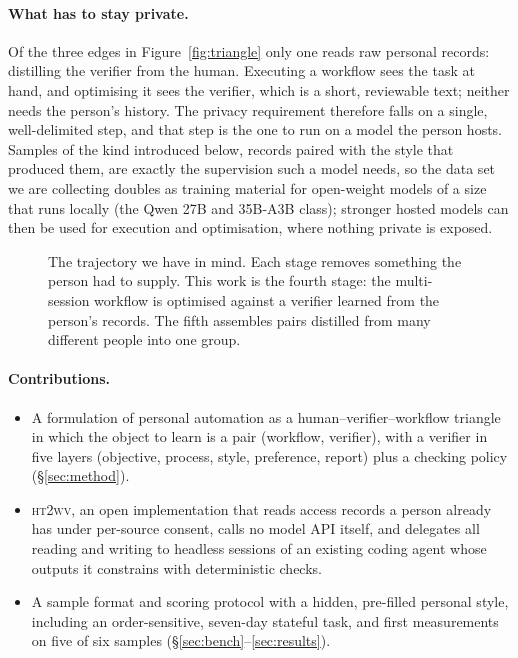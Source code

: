 \documentclass[10pt]{article}
\newcommand{\sys}{\textsc{ht2wv}}
\begin{document}
\paragraph{What has to stay private.} Of the three edges in Figure~\ref{fig:triangle} only one reads raw personal
records: distilling the verifier from the human. Executing a workflow sees the task at hand, and optimising it
sees the verifier, which is a short, reviewable text; neither needs the person's history. The privacy requirement
therefore falls on a single, well-delimited step, and that step is the one to run on a model the person hosts.
Samples of the kind introduced below, records paired with the style that produced them, are exactly the
supervision such a model needs, so the data set we are collecting doubles as training material for open-weight
models of a size that runs locally (the Qwen 27B and 35B-A3B class); stronger hosted models can then be used for
execution and optimisation, where nothing private is exposed.

\begin{figure}[t]
\centering

\caption{The trajectory we have in mind. Each stage removes something the person had to supply. This work is the
fourth stage: the multi-session workflow is optimised against a verifier learned from the person's records. The
fifth assembles pairs distilled from many different people into one group.}
\label{fig:ladder}
\end{figure}

\paragraph{Contributions.}
\begin{itemize}
\item A formulation of personal automation as a human--verifier--workflow triangle in which the object to learn is
      a pair (workflow, verifier), with a verifier in five layers
      (objective, process, style, preference, report) plus a checking policy (\S\ref{sec:method}).
\item \sys{}, an open implementation that reads access records a person already has under per-source consent,
      calls no model API itself, and delegates all reading and writing to headless sessions of an existing coding
      agent whose outputs it constrains with deterministic checks.
\item A sample format and scoring protocol with a hidden, pre-filled personal style, including an order-sensitive,
      seven-day stateful task, and first measurements on five of six samples (\S\ref{sec:bench}--\ref{sec:results}).
\end{itemize}
\end{document}
